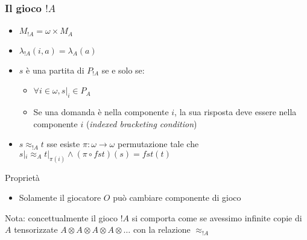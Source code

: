 \documentclass{beamer}
\begin{document}
\begin{frame}[t]






	
\end{frame}

\begin{frame}
	
	\frametitle{Il gioco $!A$}
	
	\begin{itemize}
		\item $M_{!A}=\omega \times M_A$
		\item $\lambda_{!A}(i,a)=\lambda_A(a)$
		\item $s$ è una partita di $P_{!A}$ se e solo se:
		\begin{itemize}
			\item $\forall i\in \omega , s|_i \in P_A$
			\item Se una domanda è nella componente $i$, la sua risposta deve essere nella componente $i$ (\emph{indexed bracketing condition})
		\end{itemize}

		\item $s\approx_{!A} t$ sse esiste $\pi:\omega \rightarrow \omega$ permutazione tale che $s|_i \approx_A t|_{\pi(i)} \wedge (\pi \circ fst)(s)=fst(t)$
	\end{itemize}
	
	\begin{block}{Proprietà}
		\begin{itemize}
			\item Solamente il giocatore $O$ può cambiare componente di gioco
		\end{itemize}
	\end{block}
	
	Nota: concettualmente il gioco $!A$ si comporta come se avessimo infinite copie di $A$ tensorizzate $A\otimes A\otimes A\otimes A\otimes \dots$ con la relazione $\approx_{!A}$
	
\end{frame}
\end{document}
